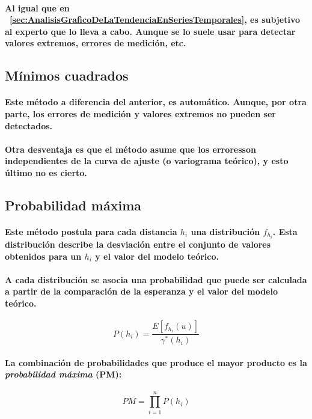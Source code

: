 \paragraph{
Al igual que en ~\ref{sec:AnalisisGraficoDeLaTendenciaEnSeriesTemporales}, es subjetivo al experto que lo lleva a cabo. Aunque se lo suele usar para detectar valores extremos, errores de medición, etc.
}


\subsection{Mínimos cuadrados}
\label{sec:AjusteDeVariogramaTeoricoPorMinimosCuadrados}
\paragraph{
Este método a diferencia del anterior, es automático. Aunque, por otra parte, los errores de medición y valores extremos no pueden ser detectados.
}
\paragraph*{
Otra desventaja es que el método asume que los errores\footnotemark[18] son independientes de la curva de ajuste (o variograma teórico), y esto último no es cierto.
}


\subsection{Probabilidad máxima}
\paragraph{
Este método postula para cada distancia $h_i$ una distribución $f_{h_i}$. Esta distribución describe la desviación entre el conjunto de valores obtenidos para un $h_i$ y el valor del modelo teórico.
}
\paragraph{
A cada distribución se asocia una probabilidad que puede ser calculada a partir de la comparación de la esperanza y el valor del modelo teórico.
}
\begin{equation}
P(h_i) = \frac{E[f_{h_i}(u)]}{\gamma^*(h_i)}
\end{equation}
\paragraph{
La combinación de probabilidades que produce el mayor producto es la \emph{probabilidad máxima} (PM):
}
\begin{equation}
PM = \prod_{i=1}^n P(h_i)
\end{equation}
